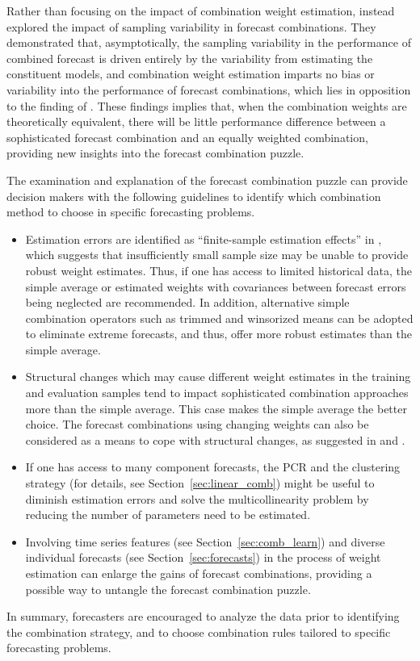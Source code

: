 \documentclass[a4paper,11pt]{article}
\begin{document}
Rather than focusing on the impact of combination weight estimation, \citet{Zischke2022-sv} instead explored the impact of sampling variability in forecast combinations. They demonstrated that, asymptotically, the sampling variability in the performance of combined forecast is driven entirely by the variability from estimating the constituent models, and combination weight estimation imparts no bias or variability into the performance of forecast combinations, which lies in opposition to the finding of \citet{Claeskens2016-pv}. These findings implies that, when the combination weights are theoretically equivalent, there will be little performance difference between a sophisticated forecast combination and an equally weighted combination, providing new insights into the forecast combination puzzle.

The examination and explanation of the forecast combination puzzle can provide decision makers with the following guidelines to identify which combination method to choose in specific forecasting problems.
\begin{itemize}
  \item Estimation errors are identified as ``finite-sample estimation effects'' in \citet{Smith2009-wd}, which suggests that insufficiently small sample size may be unable to provide robust weight estimates. Thus, if one has access to limited historical data, the simple average or estimated weights with covariances between forecast errors being neglected are recommended. In addition, alternative simple combination operators such as trimmed and winsorized means can be adopted to eliminate extreme forecasts, and thus, offer more robust estimates than the simple average.
  \item Structural changes which may cause different weight estimates in the training and evaluation samples tend to impact sophisticated combination approaches more than the simple average. This case makes the simple average the better choice. The forecast combinations using changing weights can also be considered as a means to cope with structural changes, as suggested in \citet{Diebold1987-go} and \citet{Deutsch1994-ob}.
  \item If one has access to many component forecasts, the PCR and the clustering strategy (for details, see Section~\ref{sec:linear_comb}) might be useful to diminish estimation errors and solve the multicollinearity problem by reducing the number of parameters need to be estimated.
  \item Involving time series features (see Section~\ref{sec:comb_learn}) and diverse individual forecasts (see Section~\ref{sec:forecasts}) in the process of weight estimation can enlarge the gains of forecast combinations, providing a possible way to untangle the forecast combination puzzle.
\end{itemize}
In summary, forecasters are encouraged to analyze the data prior to identifying the combination strategy, and to choose combination rules tailored to specific forecasting problems.
\end{document}
